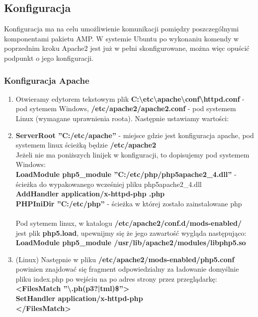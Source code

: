 \documentclass[a4paper,10pt]{article}
\begin{document}
\subsection{Konfiguracja}
Konfiguracja ma na celu umożliwienie komunikacji pomiędzy poszczególnymi komponentami pakietu AMP. W systemie Ubuntu po wykonaniu komendy w poprzednim kroku Apache2 jest już w pełni skonfigurowane, można więc opuścić podpunkt o jego konfiguracji.
\subsubsection{Konfiguracja Apache}
\begin{enumerate}
\item Otwieramy edytorem tekstowym plik \textbf{C:\textbackslash etc\textbackslash apache\textbackslash conf\textbackslash httpd.conf } - pod sytemem Windows, \textbf{/etc/apache2/apache2.conf} - pod systemem Linux (wymagane uprawnienia roota). Następnie ustawiamy wartości:\\
\item \textbf{ServerRoot ''C:/etc/apache''} - miejsce gdzie jest konfiguracja apache, pod systemem linux ścieżką będzie \textbf{/etc/apache2}\\
Jeżeli nie ma poniższych linijek w konfiguracji, to dopisujemy pod systemem Windows:\\
\textbf{LoadModule php5\_module ''C:/etc/php/php5apache2\_4.dll''} - ścieżka do wypakowanego wcześniej pliku php5apache2\_4.dll\\
\textbf{AddHandler application/x-httpd-php .php \\
PHPIniDir ''C:/etc/php''} - ścieżka w której zostało zainstalowane php\\ \\
Pod sytemem linux, w katalogu \textbf{/etc/apache2/conf.d/mods-enabled/} jest plik \textbf{php5.load}, upewnijmy się że jego zawartość wygląda następująco: \\
\textbf{LoadModule php5\_module /usr/lib/apache2/modules/libphp5.so} \\
\item (Linux) Następnie w pliku \textbf{/etc/apache2/mods-enabled/php5.conf} powinien znajdować się fragment odpowiedzialny za ładowanie domyślnie pliku index.php po wejściu na po adres strony przez przeglądarkę: \\
\textbf{    <FilesMatch ''\textbackslash .ph(p3?|tml)\$''>\\
	SetHandler application/x-httpd-php\\
    </FilesMatch>}

\end{enumerate}
\end{document}
